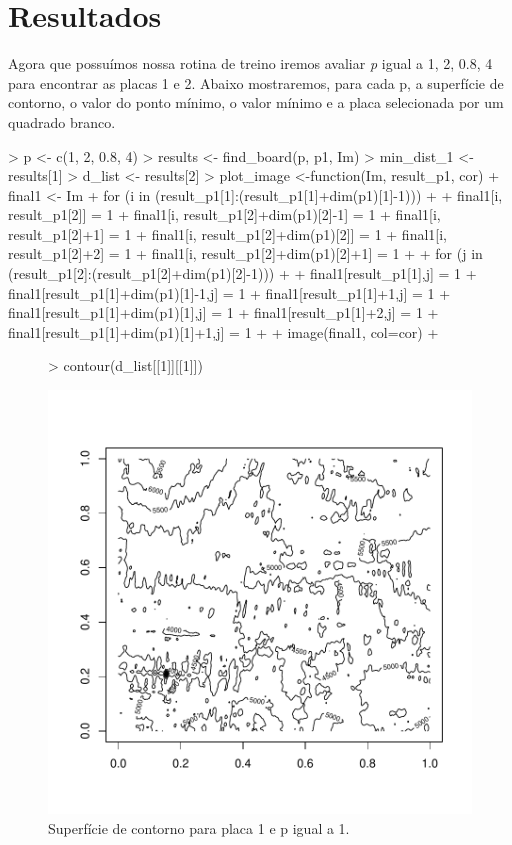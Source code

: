 \documentclass[12pt]{article}
\begin{document}
\section{Resultados}
    \par Agora que possuímos nossa rotina de treino iremos avaliar \textit{p} igual a 1, 2, 0.8, 4 para encontrar as placas 1 e 2. Abaixo mostraremos, para cada p, a superfície de contorno, o valor do ponto mínimo, o valor mínimo e a placa selecionada por um quadrado branco. 
\begin{Schunk}
\begin{Sinput}
> p <- c(1, 2, 0.8, 4)
> results <- find_board(p, p1, Im)
> min_dist_1 <- results[1]
> d_list <- results[2]
> plot_image <-function(Im, result_p1, cor){
+   final1 <- Im
+   for (i in (result_p1[1]:(result_p1[1]+dim(p1)[1]-1)))
+   {
+     final1[i, result_p1[2]] = 1
+     final1[i, result_p1[2]+dim(p1)[2]-1] = 1
+     final1[i, result_p1[2]+1] = 1
+     final1[i, result_p1[2]+dim(p1)[2]] = 1
+     final1[i, result_p1[2]+2] = 1
+     final1[i, result_p1[2]+dim(p1)[2]+1] = 1
+   }
+   for (j in (result_p1[2]:(result_p1[2]+dim(p1)[2]-1)))
+   {
+     final1[result_p1[1],j] = 1
+     final1[result_p1[1]+dim(p1)[1]-1,j] = 1
+     final1[result_p1[1]+1,j] = 1
+     final1[result_p1[1]+dim(p1)[1],j] = 1
+     final1[result_p1[1]+2,j] = 1
+     final1[result_p1[1]+dim(p1)[1]+1,j] = 1
+   }
+   image(final1, col=cor)
+ }
\end{Sinput}
\end{Schunk}

\begin{figure}
\centering
\begin{Schunk}
\begin{Sinput}
> contour(d_list[[1]][[1]])
\end{Sinput}
\end{Schunk}
\includegraphics{template_matching-004}
\caption{Superfície de contorno para placa 1 e p igual a 1.}
\label{placa1p1}
\end{figure}
\end{document}

